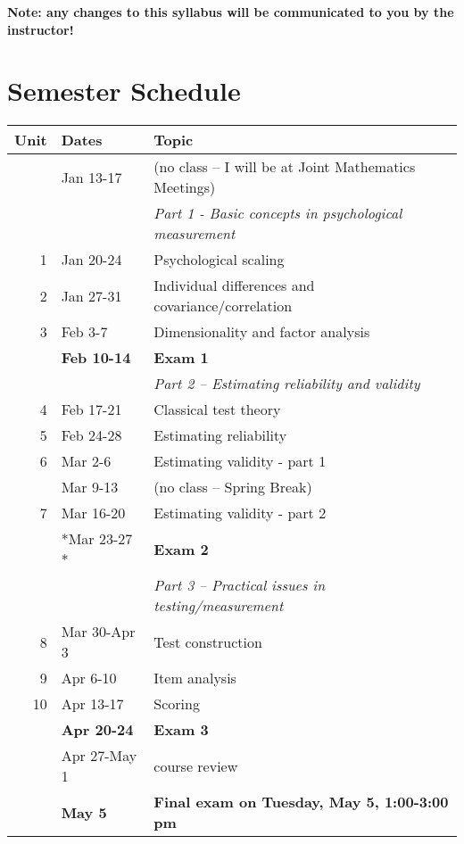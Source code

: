 \documentclass[10pt]{article}
\begin{document}
\textbf{Note:  any changes to this syllabus will be communicated to you by the instructor!}


\section*{Semester Schedule}
\label{sec:org1b1f235}
\begin{center}
\begin{tabular}{rll}
Unit & Dates & Topic\\
\hline
 & Jan 13-17 & (no class -- I will be at Joint Mathematics Meetings)\\
 &  & \emph{Part 1 - Basic concepts in psychological measurement}\\
1 & Jan 20-24 & Psychological scaling\\
2 & Jan 27-31 & Individual differences and covariance/correlation\\
3 & Feb 3-7 & Dimensionality and factor analysis\\
 & \textbf{Feb 10-14} & \textbf{Exam 1}\\
\hline
 &  & \emph{Part 2 -- Estimating reliability and validity}\\
4 & Feb 17-21 & Classical test theory\\
5 & Feb 24-28 & Estimating reliability\\
6 & Mar 2-6 & Estimating validity - part 1\\
 & Mar 9-13 & (no class -- Spring Break)\\
7 & Mar 16-20 & Estimating validity - part 2\\
 & *Mar 23-27 * & \textbf{Exam 2}\\
\hline
 &  & \emph{Part 3 -- Practical issues in testing/measurement}\\
8 & Mar 30-Apr 3 & Test construction\\
9 & Apr 6-10 & Item analysis\\
10 & Apr 13-17 & Scoring\\
 & \textbf{Apr 20-24} & \textbf{Exam 3}\\
 & Apr 27-May 1 & course review\\
 & \textbf{May 5} & \textbf{Final exam on Tuesday, May 5, 1:00-3:00 pm}\\
\hline
\end{tabular}
\end{center}
\end{document}
